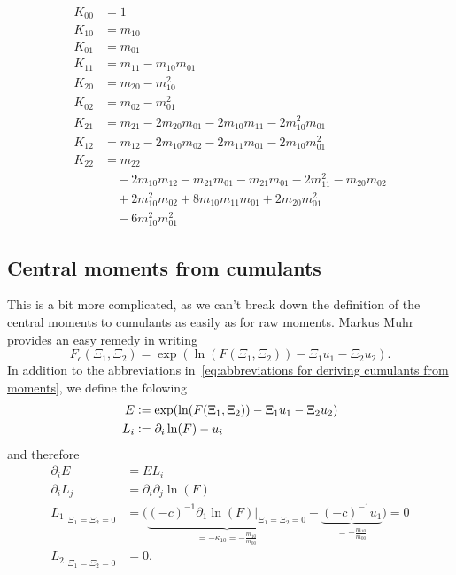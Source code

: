 \documentclass{article}
\begin{document}
\begin{align}
  K_{00} & = 1 \label{eq: kappa_00 from moments}\\
  K_{10} & = m_{10} \label{eq: kappa_10 from moments}\\
  K_{01} & = m_{01} \label{eq: kappa_01 from moments}\\
  K_{11} & = m_{11} - m_{10}m_{01} \\
  K_{20} & = m_{20} - m_{10}^2 \\
  K_{02} & = m_{02} - m_{01}^2 \\
  K_{21} & = m_{21} - 2 m_{20} m_{01}
            - 2 m_{10} m_{11} - 2 m_{10}^2m_{01} \\
  K_{12} & = m_{12} - 2 m_{10} m_{02}
            - 2 m_{11} m_{01} - 2 m_{10}m_{01}^2 \\
  K_{22} & = m_{22} \\
       & \quad - 2 m_{10}m_{12}  - m_{21}m_{01} - m_{21}m_{01} - 2 m_{11}^2 - m_{20}m_{02} \\
       & \quad +  2m_{10}^2 m_{02} + 8 m_{10}m_{11}m_{01} + 2m_{20}m_{01}^2 \\
       & \quad - 6 m_{10}^2 m_{01}^2
\end{align}

\subsection{Central moments from cumulants}
\label{sub:Central moments from cumulants}

This is a bit more complicated, as we can't break down the definition of the central moments to cumulants as easily as for raw moments.
Markus Muhr provides an easy remedy in writing
\begin{equation}
  F_c(\Xi_1, \Xi_2) = \exp(\ln(F(\Xi_1,\Xi_2)) - \Xi_1 u_1 - \Xi_2 u_2).
\end{equation}
In addition to the abbreviations in~\eqref{eq:abbreviations for deriving cumulants from moments}, we define the folowing
\begin{equation}
  \begin{aligned}
    E & \mathrel{\mathop:}= \exp(\ln(F(\Xi_1,\Xi_2)) - \Xi_1 u_1 - \Xi_2 u_2) \\
    L_i & \mathrel{\mathop:}= \partial_i \ln(F) - u_i
  \end{aligned}
\end{equation}
and therefore
\begin{equation}
  \begin{aligned}
    \partial_i E & = EL_i \\
    \partial_i L_j & = \partial_i\partial_j\ln(F)\\
    L_1\bigr|_{\Xi_1=\Xi_2 = 0} & = \bigg(
      \underbrace{{(-c)}^{-1} \partial_1\ln(F) \bigr|_{\Xi_1=\Xi_2 = 0}}_{=-\kappa_{10}=-\frac{m_{10}}{m_{00}}}
      - \underbrace{{(-c)}^{-1}u_1}_{=-\frac{m_{10}}{m_{00}}} \bigg) = 0 \\
    L_2\bigr|_{\Xi_1=\Xi_2 = 0} & = 0.
  \end{aligned}
\end{equation}
\end{document}
